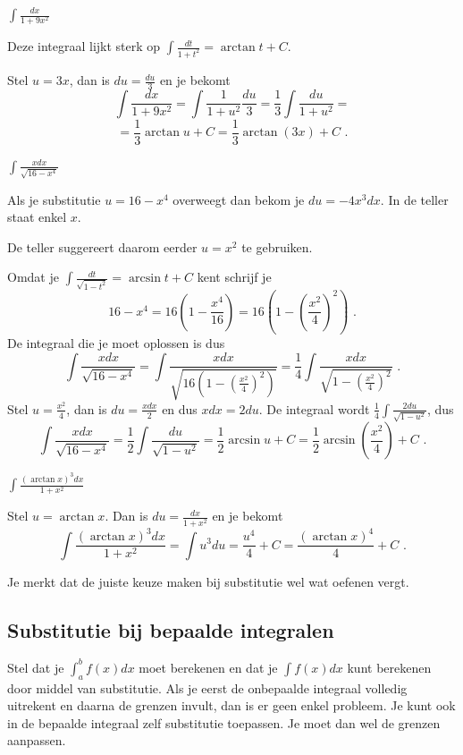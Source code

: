 \begin{voorbeeld}
	$\int \frac{dx}{1+9x^2}$
	
	Deze integraal lijkt sterk op $\int \frac{dt}{1+t^2}=\arctan t+C$.
	
	Stel $u=3x$, dan is $du=\frac{du}{3}$ en je bekomt
	\[
	\int \frac{dx}{1+9x^2}=\int \frac{1}{1+u^2} \frac{du}{3} =\frac{1}{3} \int \frac{du}{1+u^2}=
	\]
	\[
	=\frac{1}{3} \arctan u+C=\frac{1}{3} \arctan (3x)+C \text { .}
	\]
\end{voorbeeld}
	
\begin{voorbeeld}
	$\int \frac{xdx}{\sqrt{16-x^4}}$
	
	Als je substitutie $u=16-x^4$ overweegt dan bekom je $du=-4x^3dx$.
	In de teller staat enkel $x$.
	
	De teller suggereert daarom eerder $u=x^2$ te gebruiken.
	
	Omdat je $\int \frac{dt}{\sqrt {1-t^2}}=\arcsin t+C$ kent schrijf je 
	\[
	16-x^4=16\left( 1-\frac{x^4}{16} \right)=16 \left( 1-\left( \frac{x^2}{4} \right)^2 \right) \text { .}
	\]
	De integraal die je moet oplossen is dus
	\[
	\int \frac{xdx}{\sqrt{16-x^4}}=\int \frac{xdx}{\sqrt {16 \left( 1-\left( \frac{x^2}{4} \right)^2 \right)   }}=\frac{1}{4} \int \frac{xdx}{ \sqrt{ 1-\left( \frac{x^2}{4} \right)^2   }} \text { .}
	\]
	Stel $u=\frac{x^2}{4}$, dan is $du =\frac{xdx}{2}$ en dus $xdx=2du$.
	De integraal wordt $\frac{1}{4} \int \frac{2du}{\sqrt {1-u^2}}$, dus
	\[
	\int \frac{xdx}{\sqrt{16-x^4}}=\frac{1}{2} \int \frac{du}{\sqrt {1-u^2}}=\frac{1}{2} \arcsin u+C=\frac{1}{2} \arcsin \left( \frac{x^2}{4} \right)+C \text { .}
	\]
\end{voorbeeld}
	
\begin{voorbeeld}
		$\int \frac{(\arctan x)^3dx}{1+x^2}$
	
	Stel $u=\arctan x$.
	Dan is $du=\frac{dx}{1+x^2}$ en je bekomt
	\[
	\int \frac{(\arctan x)^3dx}{1+x^2}=\int u^3du=\frac{u^4}{4}+C=\frac{(\arctan x)^4}{4}+C \text { .}
	\]
\end{voorbeeld}
	
Je merkt dat de juiste keuze maken bij substitutie wel wat oefenen vergt.

\subsection{Substitutie bij bepaalde integralen}

Stel dat je $\int ^b_a f(x)dx$ moet berekenen en dat je $\int f(x)dx$ kunt berekenen door middel van substitutie.
Als je eerst de onbepaalde integraal volledig uitrekent en daarna de grenzen invult, dan is er geen enkel probleem.
Je kunt ook in de bepaalde integraal zelf substitutie toepassen.
Je moet dan wel de grenzen aanpassen.


